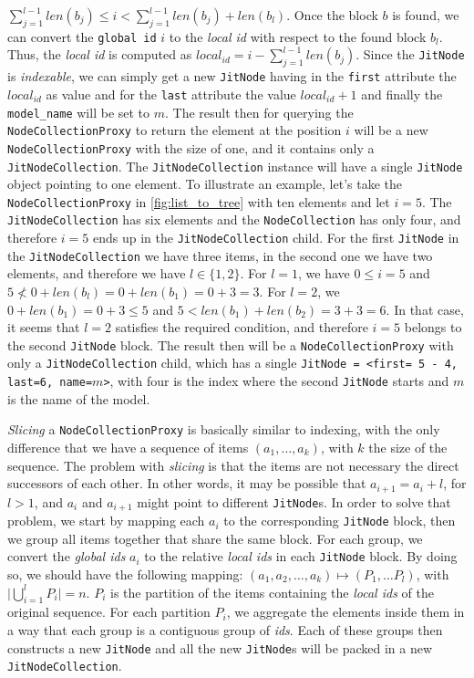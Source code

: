 $\sum_{j=1}^{l-1} len(b_j) \leq i < \sum_{j=1}^{l-1} len(b_j) + len(b_l)$. Once the block $b$ is found, we can convert the \texttt{global id} $i$ to the \emph{local id} with respect to the found block $b_l$. Thus, the \emph{local id} is computed as  $ local_{id} = i -\sum_{j=1}^{l-1} len(b_j)$. Since the \texttt{JitNode} is \emph{indexable}, we can simply get a new \texttt{JitNode} having in the \texttt{first} attribute the $local_{id}$ as value and for the \texttt{last} attribute the value $local_{id} + 1$ and finally the \texttt{model\_name} will be set to $m$. The result then for querying the \texttt{NodeCollectionProxy} to return the element at the position $i$ will be a new \texttt{NodeCollectionProxy} with the size of one,  and it contains only a \texttt{JitNodeCollection}. The \texttt{JitNodeCollection} instance will have a single \texttt{JitNode} object pointing to one element. To illustrate an example, let's take the \texttt{NodeCollectionProxy} in \autoref{fig:list_to_tree} with ten elements and let $i = 5$. The \texttt{JitNodeCollection} has six elements and the \texttt{NodeCollection} has only four, and therefore $i=5$ ends up in the \texttt{JitNodeCollection} child. For the first \texttt{JitNode} in the \texttt{JitNodeCollection} we have three items, in the second one we have two elements, and therefore we have $l \in \{1, 2\}$. For $l=1$, we have $0 \leq i = 5$ and $5 \not < 0 + len(b_l) = 0 + len(b_1) = 0 + 3 = 3$. For $l=2$, we $0 + len(b_1) = 0 + 3 \leq 5$ and $5 < len(b_1) + len(b_2) = 3 + 3 = 6.$ In that case, it seems that $l=2$ satisfies the required condition, and therefore $i=5$ belongs to the second \texttt{JitNode} block. The result then will be a \texttt{NodeCollectionProxy} with only a \texttt{JitNodeCollection} child, which has a single \texttt{JitNode = <first= 5 - 4, last=6, name=$m$>}, with four is the index where the second \texttt{JitNode} starts and $m$ is the name of the model.


\emph{Slicing} a \texttt{NodeCollectionProxy} is basically similar to indexing, with the only difference that we have a sequence of items $(a_1, \dots, a_k)$, with $k$ the size of the sequence. The problem with \emph{slicing} is that the items are not necessary the direct successors of each other. In other words, it may be possible that $a_{i+1} =a_i + l$, for $l > 1$, and $a_i$ and $a_{i+1}$ might point to different \texttt{JitNode}s. In order to solve that problem, we start by mapping each $a_i$ to the corresponding \texttt{JitNode} block, then we group all items together that share the same block. For each group, we convert the \emph{global ids} $a_i$ to the relative \emph{local ids} in each \texttt{JitNode} block. By doing so, we should have the following mapping: $(a_1, a_2, \dots, a_k) \mapsto (P_1, \dots P_l)$, with $\lvert\bigcup_{i=1}^{l} P_{i}\rvert =n$. $P_i$ is the partition of the
items containing the \emph{local ids} of the original sequence. For each partition $P_i$, we aggregate the elements inside them in a way that each group is a contiguous group of \emph{ids}. Each of these groups then constructs a new \texttt{JitNode} and all the new \texttt{JitNode}s will be packed in a new \texttt{JitNodeCollection}.



